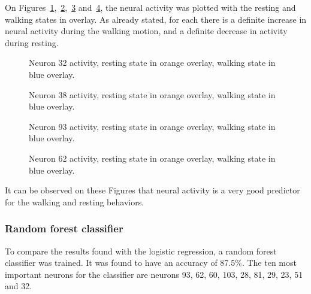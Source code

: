 On Figures~\ref{fig::ow_neuron_32},~\ref{fig::ow_neuron_38},~\ref{fig::fr_neuron_93} and~\ref{fig::rf_neuron_62}, the neural activity was plotted with the resting and walking states in overlay. As already stated, for each there is a definite increase in neural activity during the walking motion, and a definite decrease in activity during resting.

\begin{figure}[hbtp]
	\begin{center}
		
	\end{center}
	\caption{Neuron 32 activity, resting state in orange overlay, walking state in blue overlay.}
	\label{fig::ow_neuron_32}
\end{figure}

\begin{figure}[hbtp]
	\begin{center}
		
	\end{center}
	\caption{Neuron 38 activity, resting state in orange overlay, walking state in blue overlay.}
	\label{fig::ow_neuron_38}
\end{figure}

\begin{figure}[hbtp]
	\begin{center}
		
	\end{center}
	\caption{Neuron 93 activity, resting state in orange overlay, walking state in blue overlay.}
	\label{fig::fr_neuron_93}
\end{figure}

\begin{figure}[hbtp]
	\begin{center}
		
	\end{center}
	\caption{Neuron 62 activity, resting state in orange overlay, walking state in blue overlay.}
	\label{fig::rf_neuron_62}
\end{figure}

It can be observed on these Figures that neural activity is a very good predictor for the walking and resting behaviors.

\subsubsection{Random forest classifier}

To compare the results found with the logistic regression, a random forest classifier was trained.
It was found to have an accuracy of 87.5\%.
The ten most important neurons for the classifier are neurons 93, 62, 60, 103, 28, 81, 29, 23, 51 and 32.

\newpage

